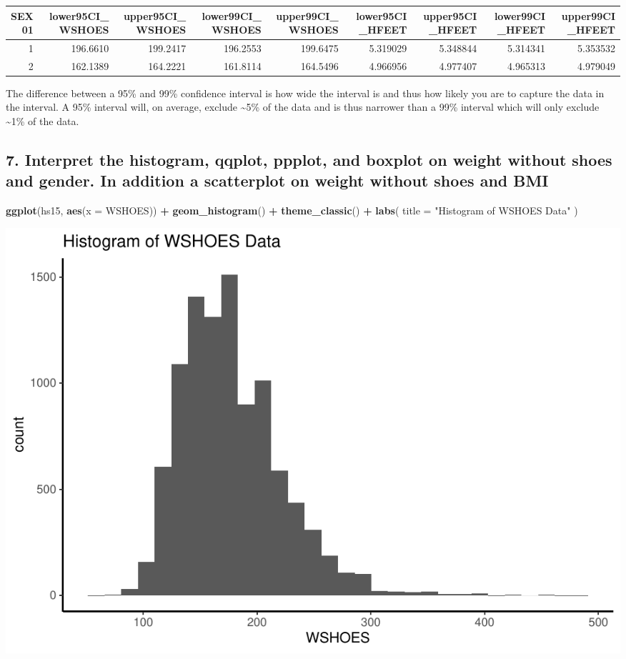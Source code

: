 \documentclass[]{article}
\newenvironment{Shaded}{\begin{snugshade}}{\end{snugshade}}
\newcommand{\DataTypeTok}[1]{\textcolor[rgb]{0.13,0.29,0.53}{#1}}
\newcommand{\KeywordTok}[1]{\textcolor[rgb]{0.13,0.29,0.53}{\textbf{#1}}}
\newcommand{\NormalTok}[1]{#1}
\newcommand{\OperatorTok}[1]{\textcolor[rgb]{0.81,0.36,0.00}{\textbf{#1}}}
\newcommand{\StringTok}[1]{\textcolor[rgb]{0.31,0.60,0.02}{#1}}
\begin{document}
\captionsetup[table]{labelformat=empty,skip=1pt}
\begin{longtable}{rrrrrrrrr}
\toprule
SEX01 & lower95CI\_WSHOES & upper95CI\_WSHOES & lower99CI\_WSHOES & upper99CI\_WSHOES & lower95CI\_HFEET & upper95CI\_HFEET & lower99CI\_HFEET & upper99CI\_HFEET \\ 
\midrule
1 & 196.6610 & 199.2417 & 196.2553 & 199.6475 & 5.319029 & 5.348844 & 5.314341 & 5.353532 \\ 
2 & 162.1389 & 164.2221 & 161.8114 & 164.5496 & 4.966956 & 4.977407 & 4.965313 & 4.979049 \\ 
\bottomrule
\end{longtable}

The difference between a 95\% and 99\% confidence interval is how wide
the interval is and thus how likely you are to capture the data in the
interval. A 95\% interval will, on average, exclude \textasciitilde{}5\%
of the data and is thus narrower than a 99\% interval which will only
exclude \textasciitilde{}1\% of the data.

\hypertarget{interpret-the-histogram-qqplot-ppplot-and-boxplot-on-weight-without-shoes-and-gender.-in-addition-a-scatterplot-on-weight-without-shoes-and-bmi}{%
\subsection{7. Interpret the histogram, qqplot, ppplot, and boxplot on
weight without shoes and gender. In addition a scatterplot on weight
without shoes and
BMI}\label{interpret-the-histogram-qqplot-ppplot-and-boxplot-on-weight-without-shoes-and-gender.-in-addition-a-scatterplot-on-weight-without-shoes-and-bmi}}

\begin{Shaded}
\begin{Highlighting}[]
\KeywordTok{ggplot}\NormalTok{(hs15, }\KeywordTok{aes}\NormalTok{(}\DataTypeTok{x =}\NormalTok{ WSHOES)) }\OperatorTok{+}
\StringTok{  }\KeywordTok{geom_histogram}\NormalTok{() }\OperatorTok{+}
\StringTok{  }\KeywordTok{theme_classic}\NormalTok{() }\OperatorTok{+}
\StringTok{  }\KeywordTok{labs}\NormalTok{(}
    \DataTypeTok{title =} \StringTok{"Histogram of WSHOES Data"}
\NormalTok{  )}
\end{Highlighting}
\end{Shaded}

\includegraphics{assignment2_files/figure-latex/q7-1.pdf}
\end{document}
